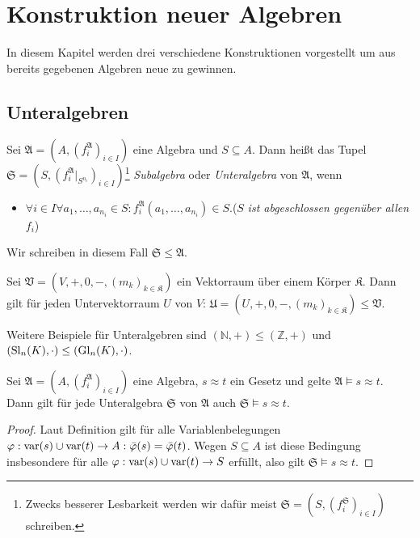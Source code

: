 \section{Konstruktion neuer Algebren}

In diesem Kapitel werden drei verschiedene Konstruktionen vorgestellt um aus bereits gegebenen Algebren neue zu gewinnen.

\subsection{Unteralgebren}

\begin{definition}
    Sei $\mathfrak{A}=(A,(f^\mathfrak{A}_i)_{i\in I})$ eine Algebra und $S\subseteq A$. Dann heißt das Tupel $\mathfrak{S}=(S,(f^\mathfrak{A}_i|_{S^{n_i}})_{i\in I})$\footnote{Zwecks besserer Lesbarkeit werden wir dafür meist $\mathfrak{S}=(S,(f^\mathfrak{S}_i)_{i\in I})$ schreiben.}
    \emph{Subalgebra} oder \emph{Unteralgebra} von $\mathfrak{A}$, wenn
    \begin{itemize}
        \item $\forall i\in I\forall a_1,\ldots,a_{n_i}\in S:f^\mathfrak{A}_i(a_1,\ldots,a_{n_i})\in S.$\tab ($S$ \emph{ist abgeschlossen gegenüber allen} $f_i$)
    \end{itemize}
    Wir schreiben in diesem Fall $\mathfrak{S}\le \mathfrak{A}$.
\end{definition}

\begin{example}
    Sei $\mathfrak{V}=(V,+,0,-,(m_k)_{k\in\mathfrak{K}})$ ein Vektorraum über einem Körper $\mathfrak{K}$. Dann gilt für
    jeden Untervektorraum $U$ von $V$: $\mathfrak{U}=(U,+,0,-,(m_k)_{k\in\mathfrak{K}})\le \mathfrak{V}$. 
    
    Weitere Beispiele für Unteralgebren sind $(\mathbb{N},+)\le(\mathbb{Z},+)$ und $(\operatorname{Sl}_n(K),\cdot)\le (\operatorname{Gl}_n(K),\cdot)$.
\end{example}

\begin{proposition}\label{prop:unteralgebra}
    Sei $\mathfrak{A}=(A,(f^\mathfrak{A}_i)_{i\in I})$ eine Algebra, $s\approx t$ ein Gesetz und gelte $\mathfrak{A}\models s\approx t$.
    Dann gilt für jede Unteralgebra $\mathfrak{S}$ von $\mathfrak{A}$ auch $\mathfrak{S}\models s\approx t$.
\end{proposition}

\begin{proof}
    Laut Definition gilt für alle Variablenbelegungen $\varphi:\operatorname{var}(s)\cup \operatorname{var}(t)\to A:\bar{\varphi}(s)=\bar{\varphi}(t)$.
    Wegen $S\subseteq A$ ist diese Bedingung insbesondere für alle $\varphi : \operatorname{var}(s) \cup \operatorname{var}(t) \to S$ erfüllt, also gilt $\mathfrak{S}\models s\approx t$.
\end{proof}

